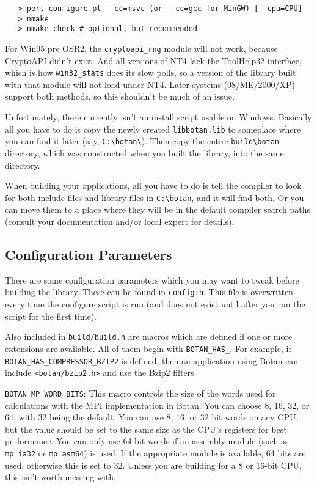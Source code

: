 \documentclass{article}
\newcommand{\filename}[1]{\texttt{#1}}
\newcommand{\module}[1]{\texttt{#1}}
\newcommand{\macro}[1]{\texttt{#1}}
\begin{document}
\begin{verbatim}
   > perl configure.pl --cc=msvc (or --cc=gcc for MinGW) [--cpu=CPU]
   > nmake
   > nmake check # optional, but recommended
\end{verbatim}

For Win95 pre OSR2, the \verb|cryptoapi_rng| module will not work,
because CryptoAPI didn't exist. And all versions of NT4 lack the
ToolHelp32 interface, which is how \verb|win32_stats| does its slow
polls, so a version of the library built with that module will not
load under NT4. Later systems (98/ME/2000/XP) support both methods, so
this shouldn't be much of an issue.

Unfortunately, there currently isn't an install script usable on
Windows. Basically all you have to do is copy the newly created
\filename{libbotan.lib} to someplace where you can find it later (say,
\verb|C:\botan\|). Then copy the entire \verb|build\botan|
directory, which was constructed when you built the library, into the
same directory.

When building your applications, all you have to do is tell the
compiler to look for both include files and library files in
\verb|C:\botan|, and it will find both. Or you can move them to a
place where they will be in the default compiler search paths (consult
your documentation and/or local expert for details).

\pagebreak

\subsection{Configuration Parameters}

There are some configuration parameters which you may want to tweak
before building the library. These can be found in
\filename{config.h}. This file is overwritten every time the configure
script is run (and does not exist until after you run the script for
the first time).

Also included in \filename{build/build.h} are macros which are defined
if one or more extensions are available. All of them begin with
\verb|BOTAN_HAS_|. For example, if \verb|BOTAN_HAS_COMPRESSOR_BZIP2|
is defined, then an application using Botan can include
\filename{<botan/bzip2.h>} and use the Bzip2 filters.

\macro{BOTAN\_MP\_WORD\_BITS}: This macro controls the size of the
words used for calculations with the MPI implementation in Botan. You
can choose 8, 16, 32, or 64, with 32 being the default. You can use 8,
16, or 32 bit words on any CPU, but the value should be set to the
same size as the CPU's registers for best performance. You can only
use 64-bit words if an assembly module (such as \module{mp\_ia32} or
\module{mp\_asm64}) is used. If the appropriate module is available,
64 bits are used, otherwise this is set to 32. Unless you are building
for a 8 or 16-bit CPU, this isn't worth messing with.
\end{document}
